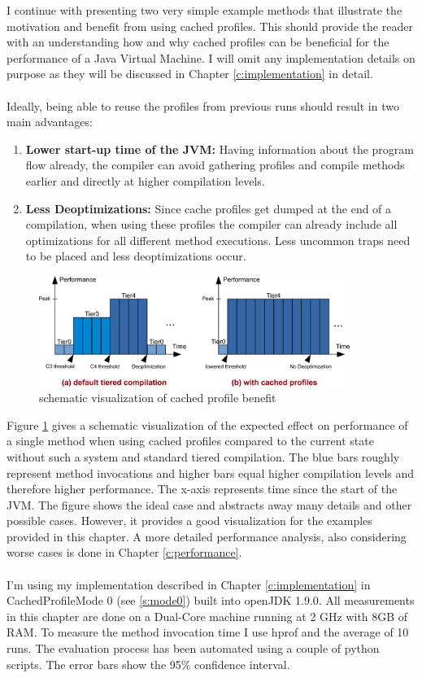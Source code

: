 I continue with presenting two very simple example methods that illustrate the motivation and benefit from using cached profiles.
This should provide the reader with an understanding how and why cached profiles can be beneficial for the performance of a Java Virtual Machine.
I will omit any implementation details on purpose as they will be discussed in Chapter \ref{c:implementation} in detail.
\\\\
Ideally, being able to reuse the profiles from previous runs should result in two main advantages:
\begin{enumerate}
  \item \textbf{Lower start-up time of the JVM:} Having information about the program flow already, the compiler can avoid gathering profiles and compile methods earlier and directly at higher compilation levels.
  \item \textbf{Less Deoptimizations:} Since cache profiles get dumped at the end of a compilation, when using these profiles the compiler can already include all optimizations for all different method executions. Less uncommon traps need to be placed and less deoptimizations occur.
\end{enumerate}
\begin{figure}[ht]
  \begin{center}
    \centering
    \includegraphics[width=0.9\textwidth]{figures/baseline_vs_usage.png}
    \caption{schematic visualization of cached profile benefit}
    \label{f:baseline_vs_usage}
  \end{center}
\end{figure}
Figure \ref{f:baseline_vs_usage} gives a schematic visualization of the expected effect on performance of a single method when using cached profiles compared to the current state without such a system and standard tiered compilation.
The blue bars roughly represent method invocations and higher bars equal higher compilation levels and therefore higher performance. The x-axis represents time since the start of the JVM. The figure shows the ideal case and abstracts away many details and other possible cases. However, it provides a good visualization for the examples provided in this chapter. A more detailed performance analysis, also considering worse cases is done in Chapter \ref{c:performance}.
\\\\
I'm using my implementation described in Chapter \ref{c:implementation} in CachedProfileMode 0 (see \ref{s:mode0}) built into openJDK 1.9.0.
All measurements in this chapter are done on a Dual-Core machine running at 2 GHz with 8GB of RAM. To measure the method invocation time I use hprof \cite{hprof} and the average of 10 runs. The evaluation process has been automated using a couple of python scripts. The error bars show the 95\% confidence interval.
